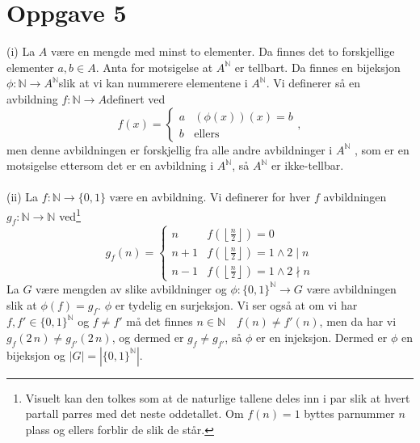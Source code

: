 \documentclass{article}[norsk]
\begin{document}
\section*{Oppgave 5}
(i) %
La $A$ være en mengde med minst to elementer. Da finnes det to forskjellige elementer $a,b\in A$. Anta for motsigelse at $A^\mathbb{N}$ er tellbart. Da finnes en bijeksjon $\phi:\mathbb{N}\rightarrow A^\mathbb{N}$slik at vi kan nummerere elementene i $A^\mathbb{N}$. Vi definerer så en avbildning $f:\mathbb{N}\rightarrow A$definert ved
\begin{equation*}
f(x)=\begin{cases}
	a	&(\phi(x))(x)=b\\
    b	&\text{ellers}
\end{cases},
\end{equation*}
men denne avbildningen er forskjellig fra alle andre avbildninger i $A^\mathbb{N}$ , som er en motsigelse ettersom det er en avbildning i $A^\mathbb{N}$, så $A^\mathbb{N}$ er ikke-tellbar.
\\\\
(ii) %
La $f:\mathbb{N}\rightarrow \{0,1\}$ være en avbildning. Vi definerer for hver $f$ avbildningen $g_f:\mathbb{N}\rightarrow\mathbb{N}$ ved\footnote{Visuelt kan den tolkes som at de naturlige tallene deles inn i par slik at hvert partall parres med det neste oddetallet. Om $f(n)=1$ byttes parnummer $n$ plass og ellers forblir de slik de står.}
\begin{equation*}
g_f(n)=\begin{cases}
	n	&f\left(\left\lfloor\frac{n}{2}\right\rfloor\right) = 0\\
    n + 1 &f\left(\left\lfloor\frac{n}{2}\right\rfloor\right) = 1\wedge 2\mid n\\
    n - 1 &f\left(\left\lfloor\frac{n}{2}\right\rfloor\right) = 1\wedge 2\nmid n
\end{cases}
\end{equation*}
La $G$ være mengden av slike avbildninger og $\phi:\{0,1\}^\mathbb{N}\rightarrow G$ være avbildningen slik at $\phi(f)=g_f$. $\phi$ er tydelig en surjeksjon. Vi ser også at om vi har $f,f'\in\{0,1\}^\mathbb{N}$ og $f\neq f'$ må det finnes $n\in\mathbb{N}\quad f(n)\neq f'(n)$, men da har vi $g_f(2\,n)\neq g_{f'}(2\, n)$, og dermed er $g_f\neq g_{f'}$, så $\phi$ er en injeksjon. Dermed er $\phi$ en bijeksjon og $|G|=\left|\{0,1\}^\mathbb{N}\right|$. 
\end{document}
